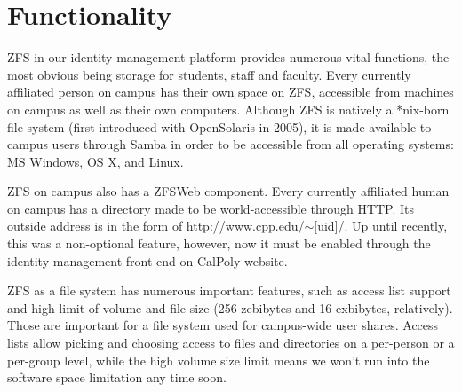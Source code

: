 \section{Functionality}
ZFS in our identity management platform provides numerous vital functions, the most obvious being storage for students, staff and faculty. Every currently affiliated person on campus has their own space on ZFS, accessible from machines on campus as well as their own computers. Although ZFS is natively a *nix-born file system (first introduced with OpenSolaris in 2005), it is made available to campus users through Samba in order to be accessible from all operating systems: MS Windows, OS X, and Linux. 

ZFS on campus also has a ZFSWeb component. Every currently affiliated human on campus has a directory made to be world-accessible through HTTP. Its outside address is in the form of http://www.cpp.edu/$\sim$[uid]/. Up until recently, this was a non-optional feature, however, now it must be enabled through the identity management front-end on CalPoly website.

ZFS as a file system has numerous important features, such as access list support and high limit of volume and file size (256 zebibytes and 16 exbibytes, relatively). Those are important for a file system used for campus-wide user shares. Access lists allow picking and choosing access to files and directories on a per-person or a per-group level, while the high volume size limit means we won't run into the software space limitation any time soon. 
